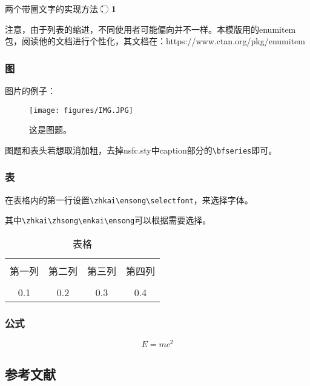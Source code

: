 两个带圈文字的实现方法：
\textcircled{\raisebox{-0.8pt}{1}}
\textcircled{\textbf{\small 1}}

注意，由于列表的缩进，不同使用者可能偏向并不一样。本模版用的enumitem包，阅读他的文档进行个性化，其文档在：https://www.ctan.org/pkg/enumitem
\subsubsection{图}
图片的例子：
\begin{figure}[h]
\centering %
\texttt{[image: figures/IMG.JPG]}
\captionsetup{justification=centering} %
\caption{这是图题。}
\end{figure}
图题和表头若想取消加粗，去掉nsfc.sty中caption部分的\verb|\bfseries|即可。


\subsubsection{表}
在表格内的第一行设置\verb|\zhkai\ensong\selectfont|，来选择字体。

其中\verb|\zhkai\zhsong\enkai\ensong|可以根据需要选择。
\begin{table}[htbp]
	\zhkai\ensong\selectfont%
	\centering  %
	\caption{表格}  %
	\label{table1}  %
	\begin{tabular}{|c|c|c|c|}  
		\hline  %
		& & & \\[-6pt]  %
		第一列&第二列&第三列&第四列 \\  %
		\hline
		& & & \\[-6pt]  %
		0.1&0.2&0.3&0.4 \\
		\hline
	\end{tabular}
\end{table}

\subsubsection{公式}

\begin{equation}
	E=mc^2
\end{equation}

\begin{REF}
\subsection*{参考文献}
\vspace{-50pt}

\end{REF}

\newpage%
